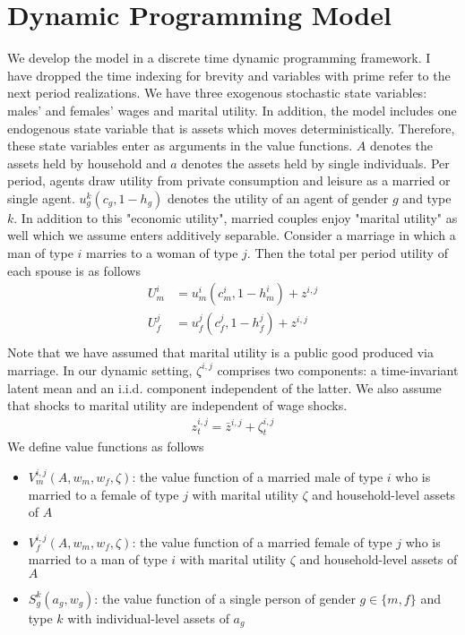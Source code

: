 \section{Dynamic Programming Model}
We develop the model in a discrete time dynamic programming framework. I have dropped the time indexing for brevity and variables with prime refer to the next period realizations. We have three exogenous stochastic state variables: males' and females' wages and marital utility. In addition, the model includes one endogenous state variable that is assets which moves deterministically. Therefore, these state variables enter as arguments in the value functions. $A$ denotes the assets held by household and $a$ denotes the assets held by single individuals. Per period, agents draw utility from private consumption and leisure as a married or single agent. $u_g^k(c_g, 1-h_g)$ denotes the utility of an agent of gender $g$ and type $k$. In addition to this "economic utility", married couples enjoy "marital utility" as well which we assume enters additively separable. Consider a marriage in which a man of type $i$ marries to a woman of type $j$. Then the total per period utility of each spouse is as follows 
\begin{align*}
U_m^i &= u_m^i(c_m^i, 1-h_m^i) + z^{i,j} \\
U_f^j&= u_f^j(c_f^j, 1-h_f^j) + z^{i,j} \\
\end{align*}
Note that we have assumed that marital utility is a public good produced via marriage. In our dynamic setting, $\zeta^{i,j} $ comprises two components: a time-invariant latent mean and an i.i.d. component independent of the latter. We also assume that shocks to marital utility are independent of wage shocks. 
\begin{align*}
 z^{i,j}_t =  \bar z^{i,j} + \zeta^{i,j}_t
\end{align*}
We define value functions as follows
\begin{itemize}
\item $V_m^{i,j}(A, w_m, w_f, \zeta)$: the value function of a married male of type $i$ who is married to a female of type $j$ with marital utility $\zeta$ and household-level assets of $A$
\item $V_f^{i,j}(A, w_m, w_f, \zeta)$: the value function of a married female of type $j$ who is married to a man of type $i$ with marital utility $\zeta$ and household-level assets of $A$

\item $S_g^k(a_g, w_g)$: the value function of a single person of gender $g \in \{m, f\}$ and type $k$ with individual-level assets of $a_g$

\end{itemize}

